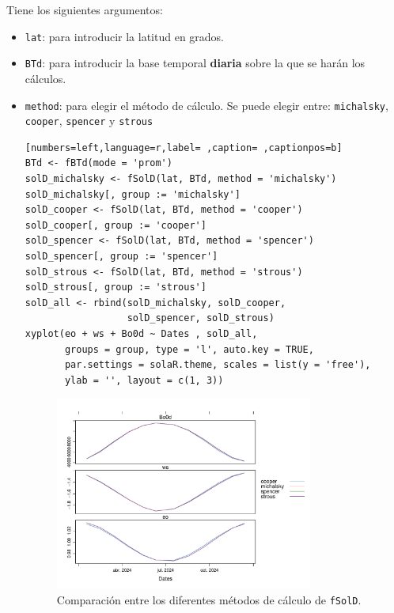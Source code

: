 Tiene los siguientes argumentos:
\begin{itemize}
\item \texttt{lat}: para introducir la latitud en grados.
\item \texttt{BTd}: para introducir la base temporal \textbf{diaria} sobre la que se harán los cálculos.
\item \texttt{method}: para elegir el método de cálculo. Se puede elegir entre: \texttt{michalsky}, \texttt{cooper}, \texttt{spencer} y \texttt{strous}
\begin{lstlisting}[numbers=left,language=r,label= ,caption= ,captionpos=b]
BTd <- fBTd(mode = 'prom')
solD_michalsky <- fSolD(lat, BTd, method = 'michalsky')
solD_michalsky[, group := 'michalsky']
solD_cooper <- fSolD(lat, BTd, method = 'cooper')
solD_cooper[, group := 'cooper']
solD_spencer <- fSolD(lat, BTd, method = 'spencer')
solD_spencer[, group := 'spencer']
solD_strous <- fSolD(lat, BTd, method = 'strous')
solD_strous[, group := 'strous']
solD_all <- rbind(solD_michalsky, solD_cooper,
                  solD_spencer, solD_strous)
xyplot(eo + ws + Bo0d ~ Dates , solD_all,
       groups = group, type = 'l', auto.key = TRUE,
       par.settings = solaR.theme, scales = list(y = 'free'),
       ylab = '', layout = c(1, 3))
\end{lstlisting}

\begin{figure}[!htb]
\centering
\includegraphics[width=0.8\textwidth]{figuras/codigo-fSolD.pdf}
\caption{Comparación entre los diferentes métodos de cálculo de \texttt{fSolD}.}
\end{figure}
\end{itemize}
